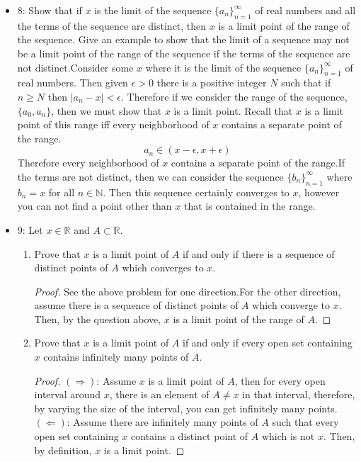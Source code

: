 \documentclass[hidelinks,12pt]{article}
\theoremstyle{definition}
\newcommand{\R}{\mathbb{R}}
\newcommand{\N}{\mathbb{N}}
\begin{document}
\begin{itemize}
    \item 8: Show that if $x$ is the limit of the sequence $\{a_n\}^{\infty}_{n=1}$ of real numbers and all the terms of the sequence are distinct, then $x$ is a limit point of the range of the sequence. Give an example to show that the limit of a sequence may not be a limit point of the range of the sequence if the terms of the sequence are not distinct.\newline Consider some $x$ where it is the limit of the sequence $\{a_n\}^{\infty}_{n=1}$ of real numbers. Then given $\epsilon>0$ there is a positive integer $N$ such that if $n\geq N$ then $|a_n-x|<\epsilon$. Therefore if we consider the range of the sequence, $\{a_0,a_n\}$, then we must show that $x$ is a limit point. Recall that $x$ is a limit point of this range iff every neighborhood of $x$ contains a separate point of the range.$$a_n\in(x-\epsilon,x+\epsilon)$$ Therefore every neighborhood of $x$ contains a separate point of the range.\newline If the terms are not distinct, then we can consider the sequence $\{b_n\}^{\infty}_{n=1}$ where $b_n=x$ for all $n\in\N$. Then this sequence certainly converges to $x$, however you can not find a point other than $x$ that is contained in the range.
    \item 9: Let $x\in\R$ and $A\subset\R$.\begin{enumerate}[label=(\alph*)]
        \item Prove that $x$ is a limit point of $A$ if and only if there is a sequence of distinct points of $A$ which converges to $x$. \begin{proof}See the above problem for one direction.\newline For the other direction, assume there is a sequence of distinct points of $A$ which converge to $x$. Then, by the question above, $x$ is a limit point of the range of $A$.\end{proof}
        \item Prove that $x$ is a limit point of $A$ if and only if every open set containing $x$ contains infinitely many points of $A$.\begin{proof}$(\Longrightarrow)$: Assume $x$ is a limit point of $A$, then for every open interval around $x$, there is an element of $A\neq x$ in that interval, therefore, by varying the size of the interval, you can get infinitely many points.\newline $(\Longleftarrow)$: Assume there are infinitely many points of $A$ such that every open set containing $x$ contains a distinct point of $A$ which is not $x$. Then, by definition, $x$ is a limit point.
        \end{proof}
    \end{enumerate}
\end{itemize}
\end{document}
